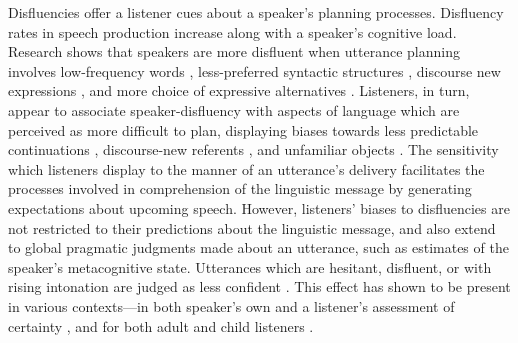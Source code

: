 \documentclass[man]{apa6}
\begin{document}
Disfluencies offer a listener cues about a speaker's planning processes. 
Disfluency rates in speech production increase along with a speaker's cognitive load\citep{Bortfeld2001, Goldman-Eisler1968}.
Research shows that speakers are more disfluent when utterance planning involves low-frequency words \citep{Beattie1979}, less-preferred syntactic structures \citep{Cook2009}, discourse new expressions \citep{Arnold2003}, and more choice of expressive alternatives \citep{Schachter1991}. 
Listeners, in turn, appear to associate speaker-disfluency with aspects of language which are perceived as more difficult to plan, displaying biases towards less predictable continuations \citep{Corley2007}, discourse-new referents \citep{Barr2001, Arnold2004}, and unfamiliar objects \citep{Arnold2007}.
The sensitivity which listeners display to the manner of an utterance's delivery facilitates the processes involved in comprehension of the linguistic message by generating expectations about upcoming speech. 
However, listeners' biases to disfluencies are not restricted to their predictions about the linguistic message, and also extend to global pragmatic judgments made about an utterance, such as estimates of the speaker's metacognitive state.
Utterances which are hesitant, disfluent, or with rising intonation are judged as less confident \citep{Smith1993, Brennan1995}.
This effect has shown to be present in various contexts---in both speaker's own and a listener's assessment of certainty \citep{Swerts2005}, and for both adult and child listeners \citep{Krahmer2005}.\\
\end{document}
